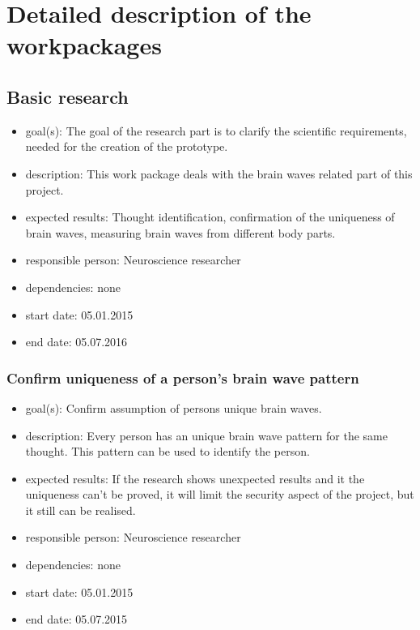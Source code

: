 \section{Detailed description of the workpackages}
\label{sect:workplan}

\subsection{Basic research}
\begin{itemize}
 \item goal(s): The goal of the research part is to clarify the scientific requirements, needed for the creation of the prototype.
 \item description: This work package deals with the brain waves related part of this project.
 \item expected results: Thought identification, confirmation of the uniqueness of brain waves, measuring brain waves from different body parts.
 \item responsible person: Neuroscience researcher
 \item dependencies: none
 \item start date: 05.01.2015
 \item end date: 05.07.2016
\end{itemize}

\subsubsection{Confirm uniqueness of a person’s brain wave pattern}
\begin{itemize}
 \item goal(s): Confirm assumption of persons unique brain waves.
 \item description: Every person has an unique brain wave pattern for the same thought. This pattern can be used to identify the person.
 \item expected results: If the research shows unexpected results and it the uniqueness can’t be proved, it will limit the security aspect of the project, but it still can be realised.
 \item responsible person: Neuroscience researcher
 \item dependencies: none
 \item start date: 05.01.2015
 \item end date: 05.07.2015
\end{itemize}

